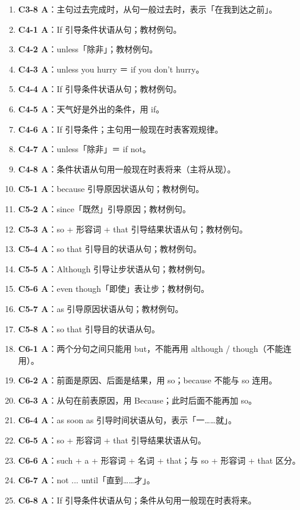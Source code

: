 \documentclass[11pt,a4paper]{ctexart}
\begin{document}
\begin{enumerate}[leftmargin=1.6em,itemsep=2pt]
\item \textbf{C3-8 A}：主句过去完成时，从句一般过去时，表示「在我到达之前」。
\item \textbf{C4-1 A}：If 引导条件状语从句；教材例句。
\item \textbf{C4-2 A}：unless「除非」；教材例句。
\item \textbf{C4-3 A}：unless you hurry ＝ if you don’t hurry。
\item \textbf{C4-4 A}：If 引导条件状语从句；教材例句。
\item \textbf{C4-5 A}：天气好是外出的条件，用 if。
\item \textbf{C4-6 A}：If 引导条件；主句用一般现在时表客观规律。
\item \textbf{C4-7 A}：unless「除非」＝ if not。
\item \textbf{C4-8 A}：条件状语从句用一般现在时表将来（主将从现）。
\item \textbf{C5-1 A}：because 引导原因状语从句；教材例句。
\item \textbf{C5-2 A}：since「既然」引导原因；教材例句。
\item \textbf{C5-3 A}：so + 形容词 + that 引导结果状语从句；教材例句。
\item \textbf{C5-4 A}：so that 引导目的状语从句；教材例句。
\item \textbf{C5-5 A}：Although 引导让步状语从句；教材例句。
\item \textbf{C5-6 A}：even though「即使」表让步；教材例句。
\item \textbf{C5-7 A}：as 引导原因状语从句；教材例句。
\item \textbf{C5-8 A}：so that 引导目的状语从句。
\item \textbf{C6-1 A}：两个分句之间只能用 but，不能再用 although / though（不能连用）。
\item \textbf{C6-2 A}：前面是原因、后面是结果，用 so；because 不能与 so 连用。
\item \textbf{C6-3 A}：从句在前表原因，用 Because；此时后面不能再加 so。
\item \textbf{C6-4 A}：as soon as 引导时间状语从句，表示「一……就」。
\item \textbf{C6-5 A}：so + 形容词 + that 引导结果状语从句。
\item \textbf{C6-6 A}：such + a + 形容词 + 名词 + that；与 so + 形容词 + that 区分。
\item \textbf{C6-7 A}：not ... until「直到……才」。
\item \textbf{C6-8 A}：If 引导条件状语从句；条件从句用一般现在时表将来。
\end{enumerate}
\end{document}
